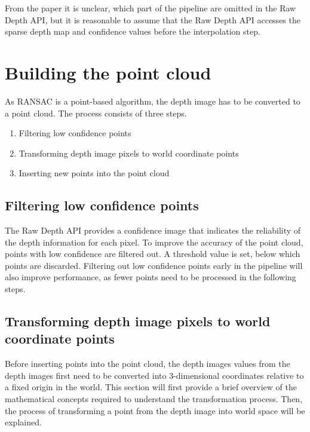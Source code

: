 From the paper it is unclear, which part of the pipeline are omitted in the Raw Depth API,
but it is reasonable to assume that the Raw Depth API accesses the sparse depth map and confidence values before the interpolation step.

\cite{valentin_depth_2018}


\section{Building the point cloud}
As RANSAC is a point-based algorithm, the depth image has to be converted to a point cloud.
The process consists of three steps.
\begin{enumerate}
    \item Filtering low confidence points
    \item Transforming depth image pixels to world coordinate points
    \item Inserting new points into the point cloud
\end{enumerate}

\subsection{Filtering low confidence points}
The Raw Depth API provides a confidence image that indicates the reliability of the depth information for each pixel.
To improve the accuracy of the point cloud, points with low confidence are filtered out.
A threshold value is set, below which points are discarded.
Filtering out low confidence points early in the pipeline will also improve performance,
as fewer points need to be processed in the following steps.

\subsection{Transforming depth image pixels to world coordinate points}
Before inserting points into the point cloud, the depth images values from the depth images
first need to be converted into 3-dimensional coordinates relative to a fixed origin in the world.
This section will first provide a brief overview of the mathematical concepts required to understand the transformation process.
Then, the process of transforming a point from the depth image into world space will be explained.


